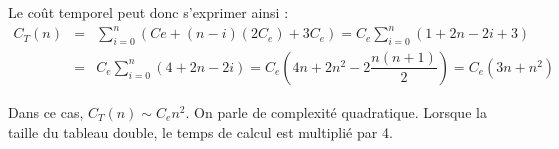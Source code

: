 \begin{exemple}
Le coût temporel peut donc s'exprimer ainsi : 
\begin{eqnarray*}
C_T(n) &=& \sum\limits_{i=0}^{n} \left(Ce + (n-i)\left( 2 C_e\right) + 3 C_e \right) = C_e\sum\limits_{i=0}^{n} \left( 1+2n-2i + 3 \right) \\
&=&C_e\sum\limits_{i=0}^{n} \left( 4+2n-2i  \right) =  C_e \left( 4n+2n^2 -  2\dfrac{n(n+1)}{2}\right) = C_e\left( 3n+n^2\right)
\end{eqnarray*}

Dans ce cas, $C_T(n)\sim C_e n^2$. On parle de complexité quadratique. Lorsque la taille du tableau double, le temps de calcul est multiplié par 4.

\end{exemple}


